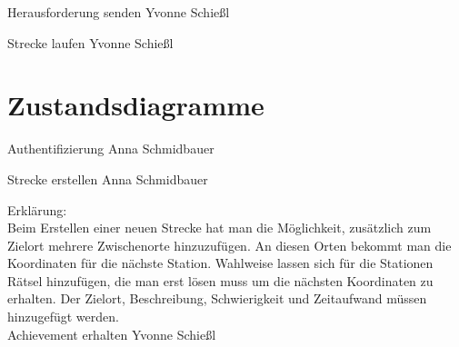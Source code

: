 \documentclass[a4paper, 12pp]{article}
\begin{document}
{\Large Herausforderung senden}
Yvonne Schießl
\begin{figure}[H] 
\centering
	\fbox{\begin{minipage}{16cm} 
	\end{minipage}}
\end{figure}

{\Large Strecke laufen}
Yvonne Schießl
\begin{figure}[H] 
\centering
	\fbox{\begin{minipage}{16cm} 
	\end{minipage}}
\end{figure}

\section{Zustandsdiagramme}

{\Large Authentifizierung}
Anna Schmidbauer
\begin{figure}[H] 
\centering
	\fbox{\begin{minipage}{16cm} 
	\end{minipage}}
\end{figure}


{\Large Strecke erstellen}
Anna Schmidbauer
\begin{figure}[H] 
\centering
	\fbox{\begin{minipage}{16cm} 
	\end{minipage}}
\end{figure}

Erklärung:\\
Beim Erstellen einer neuen Strecke hat man die Möglichkeit, zusätzlich zum Zielort mehrere Zwischenorte hinzuzufügen. An diesen Orten bekommt man die Koordinaten für die nächste Station. Wahlweise lassen sich für die Stationen Rätsel hinzufügen, die man erst lösen muss um die nächsten Koordinaten zu erhalten. Der Zielort, Beschreibung, Schwierigkeit und Zeitaufwand müssen hinzugefügt werden.\\

{\Large Achievement erhalten}
Yvonne Schießl
\begin{figure}[H] 
\centering
	\fbox{\begin{minipage}{16cm} 
	\end{minipage}}
\end{figure}
\end{document}
